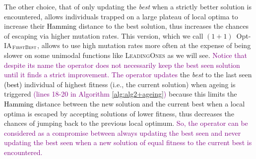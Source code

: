 \documentclass[lettersize,journal]{IEEEtran}
\newcommand{\rev}[1]{\textcolor{black}{#1}}
\newcommand{\rerev}[1]{\textcolor{purple}{#1}}
\begin{document}
The other choice, that of only updating the {\it best} when a strictly better solution is encountered, allows individuals trapped on a large plateau of local optima to increase their \rev{Hamming} distance to the best solution, thus increases the chances of escaping via higher mutation rates. This version, which we call $(1+1)$~Opt-IA$_{\textsc{FirstBest}}$, allows to use high mutation rates more often at the expense of being slower on some unimodal functions like \textsc{LeadingOnes} as we will see. \rerev{Notice that despite its name the operator does not necessarily keep the best seen solution until it finds a strict improvement. The operator updates} the {\it best} to the last seen \rev{(best)} individual of highest fitness (i.e., the current solution) when ageing is triggered \rerev{(lines 18-20 in Algorithm \ref{alg:alg2+ageing})}  because this limits the \rev{Hamming} distance between the new solution and the current best when a local optima is escaped by accepting solutions of lower fitness, thus decreases the chances of jumping back to the previous local optimum.
\rerev{So, the operator can be considered as a compromise between always updating the best seen and never updating the best seen when a new solution of equal fitness to the current best is encountered.}  
 	
\end{document}
